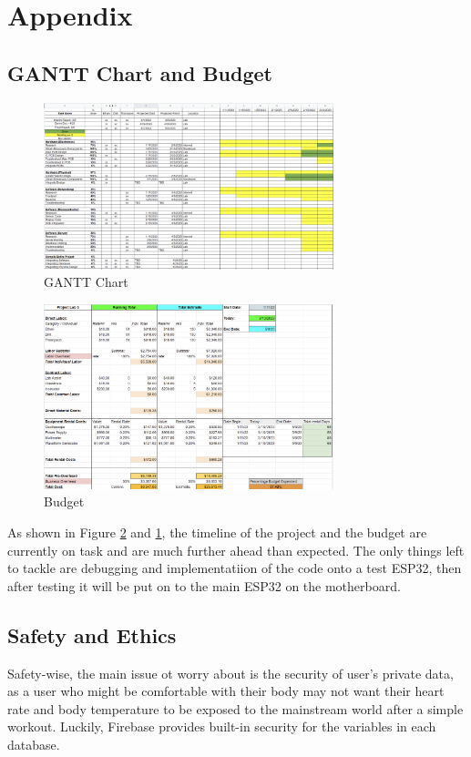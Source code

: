 \documentclass[12pt]{article}
\begin{document}
\newpage
\newpage
\section{Appendix}
\subsection{GANTT Chart and Budget}
\begin{figure}[ht]
    \centering
    \includegraphics[width=0.75\textwidth]{images/gantt.png}
    \caption{GANTT Chart}
    \label{gantt}
\end{figure}

\begin{figure}[ht]
    \centering
    \includegraphics[width=0.75\textwidth]{images/budget.png}
    \caption{Budget}
    \label{budget}
\end{figure}

   As shown in Figure \ref{budget} and \ref{gantt}, the timeline of the project and the budget are currently on task and are much further ahead than expected. The only things left to tackle are debugging and implementatiion of the code onto a test ESP32, then after testing it will be put on to the main ESP32 on the motherboard. 
\subsection{Safety and Ethics}
    Safety-wise, the main issue ot worry about is the security of user's private data, as a user who might be comfortable with their body may not want their heart rate and body temperature to be exposed to the mainstream world after a simple workout. Luckily, Firebase provides built-in security for the variables in each database.
\newpage
\printbibliography
\end{document}
